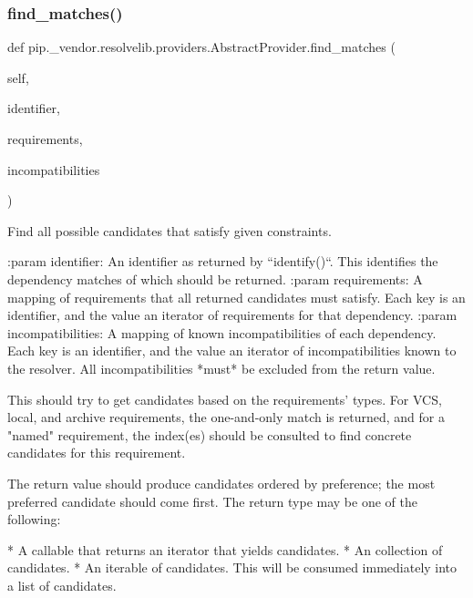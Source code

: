 \subsubsection{\texorpdfstring{find\+\_\+matches()}{find\_matches()}}
{\footnotesize\ttfamily def pip.\+\_\+vendor.\+resolvelib.\+providers.\+Abstract\+Provider.\+find\+\_\+matches (\begin{DoxyParamCaption}\item[{}]{self,  }\item[{}]{identifier,  }\item[{}]{requirements,  }\item[{}]{incompatibilities }\end{DoxyParamCaption})}

\begin{DoxyVerb}Find all possible candidates that satisfy given constraints.

:param identifier: An identifier as returned by ``identify()``. This
    identifies the dependency matches of which should be returned.
:param requirements: A mapping of requirements that all returned
    candidates must satisfy. Each key is an identifier, and the value
    an iterator of requirements for that dependency.
:param incompatibilities: A mapping of known incompatibilities of
    each dependency. Each key is an identifier, and the value an
    iterator of incompatibilities known to the resolver. All
    incompatibilities *must* be excluded from the return value.

This should try to get candidates based on the requirements' types.
For VCS, local, and archive requirements, the one-and-only match is
returned, and for a "named" requirement, the index(es) should be
consulted to find concrete candidates for this requirement.

The return value should produce candidates ordered by preference; the
most preferred candidate should come first. The return type may be one
of the following:

* A callable that returns an iterator that yields candidates.
* An collection of candidates.
* An iterable of candidates. This will be consumed immediately into a
  list of candidates.
\end{DoxyVerb}
 \mbox{\label{classpip_1_1__vendor_1_1resolvelib_1_1providers_1_1AbstractProvider_aaa369cd95ed63b6dde6b6babaa5a4b95}} 
